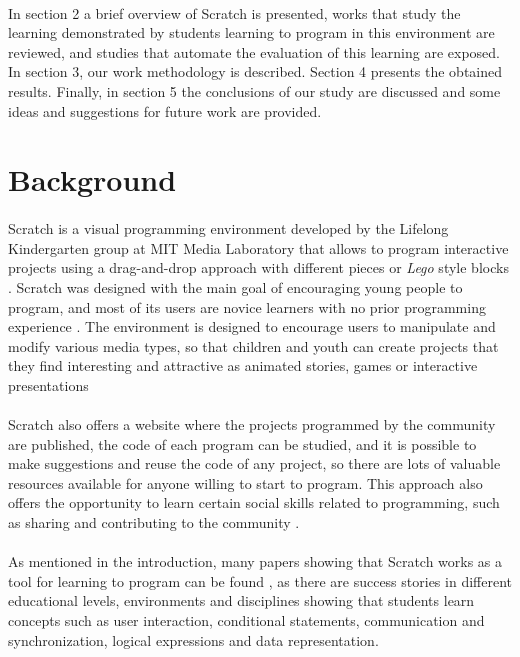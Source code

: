 \documentclass[a4paper,10pt]{article}
\begin{document}
\paragraph{}In section 2 a brief overview of Scratch is presented, works that study the learning demonstrated by students learning to program in this environment are reviewed, and studies that automate the evaluation of this learning are exposed. In section 3, our work methodology is described. Section 4 presents the obtained results. Finally, in section 5 the conclusions of our study are discussed and some ideas and suggestions for future work are provided.

\section{Background}

\paragraph{}Scratch is a visual programming environment developed by the Lifelong Kindergarten group at MIT Media Laboratory that allows to program interactive projects using a drag-and-drop approach with different pieces or \textit {Lego} style blocks \cite{resnick2009scratch}. Scratch was designed with the main goal of encouraging young people to program, and most of its users are novice learners with no prior programming experience \cite{maloney2010scratch}. The environment is designed to encourage users to manipulate and modify various media types, so that children and youth can create projects that they find interesting and attractive as animated stories, games or interactive presentations \cite{maloney2008programming}
\paragraph{}Scratch also offers a website where the projects programmed by the community are published, the code of each program can be studied, and it is possible to make suggestions and reuse the code of any project, so there are lots of valuable resources available for anyone willing to start to program. This approach also offers the opportunity to learn certain social skills related to programming, such as sharing and contributing to the community \cite{scaffidi2012skill}.
\paragraph{}As mentioned in the introduction, many papers showing that Scratch works as a tool for learning to program can be found \cite{maloney2008programming, franklin2013assessment, scaffidi2012skill, malan2007scratch}, as there are success stories in different educational levels, environments and disciplines showing that students learn concepts such as user interaction, conditional statements, communication and synchronization, logical expressions and data representation.
\end{document}
